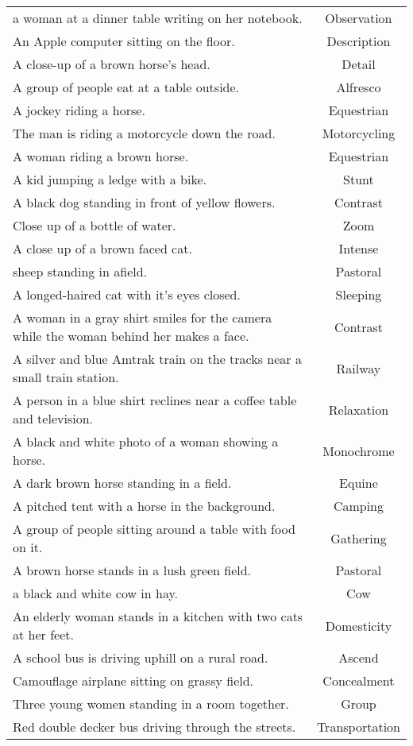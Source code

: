 \documentclass{article}
\begin{document}
\begin{longtable}{p{12cm}c}
a woman at a dinner table writing on her notebook. & Observation\\
An Apple computer sitting on the floor. & Description\\
A close-up of a brown horse's head. & Detail\\
A group of people eat at a table outside. & Alfresco\\
A jockey riding a horse. & Equestrian\\
The man is riding a motorcycle down the road. & Motorcycling\\
A woman riding a brown horse. & Equestrian\\
A kid jumping a ledge with a bike. & Stunt\\
A black dog standing in front of yellow flowers. & Contrast\\
Close up of a bottle of water. & Zoom\\
A close up of a brown faced cat. & Intense\\
sheep standing in afield. & Pastoral\\
A longed-haired cat with it's eyes closed. & Sleeping\\
A woman in a gray shirt smiles for the camera while the woman behind her makes a face. & Contrast\\
A silver and blue Amtrak train on the tracks near a small train station. & Railway\\
A person in a blue shirt reclines near a coffee table and television. & Relaxation\\
A black and white photo of a woman showing a horse. & Monochrome\\
A dark brown horse standing in a field. & Equine\\
A pitched tent with a horse in the background. & Camping\\
A group of people sitting around a table with food on it. & Gathering\\
A brown horse stands in a lush green field. & Pastoral\\
a black and white cow in hay. & Cow\\
An elderly woman stands in a kitchen with two cats at her feet. & Domesticity\\
A school bus is driving uphill on a rural road. & Ascend\\
Camouflage airplane sitting on grassy field. & Concealment\\
Three young women standing in a room together. & Group\\
Red double decker bus driving through the streets. & Transportation\\

\end{longtable}
\end{document}
